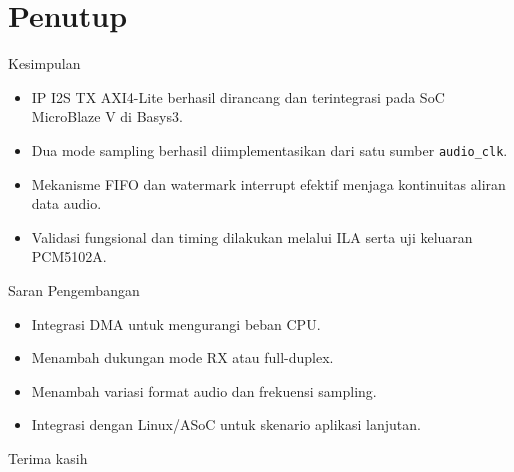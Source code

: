 \documentclass[aspectratio=169]{beamer}
\begin{document}
\section{Penutup}

\begin{frame}{Kesimpulan}
  \begin{itemize}
    \item IP I2S TX AXI4-Lite berhasil dirancang dan terintegrasi pada SoC MicroBlaze V di Basys3.
    \item Dua mode sampling berhasil diimplementasikan dari satu sumber \texttt{audio\_clk}.
    \item Mekanisme FIFO dan watermark interrupt efektif menjaga kontinuitas aliran data audio.
    \item Validasi fungsional dan timing dilakukan melalui ILA serta uji keluaran PCM5102A.
  \end{itemize}
\end{frame}

\begin{frame}{Saran Pengembangan}
  \begin{itemize}
    \item Integrasi DMA untuk mengurangi beban CPU.
    \item Menambah dukungan mode RX atau full-duplex.
    \item Menambah variasi format audio dan frekuensi sampling.
    \item Integrasi dengan Linux/ASoC untuk skenario aplikasi lanjutan.
  \end{itemize}
\end{frame}

\begin{frame}
  \centering
  \Large Terima kasih
\end{frame}
\end{document}
